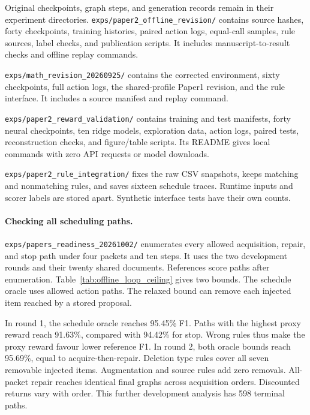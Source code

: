 \label{app:artifact_index}

Original checkpoints, graph steps, and generation records remain in
their experiment directories.
\texttt{exps/paper2\_offline\_revision/} contains source hashes, forty
checkpoints, training histories, paired action logs, equal-call samples,
rule sources, label checks, and publication scripts. It includes
manuscript-to-result checks and offline replay commands.

\texttt{exps/math\_revision\_20260925/} contains the corrected environment,
sixty checkpoints, full action logs, the shared-profile Paper1 revision,
and the rule interface. It includes a source manifest and replay command.

\texttt{exps/paper2\_reward\_validation/} contains training and test
manifests, forty neural checkpoints, ten ridge models, exploration data,
action logs, paired tests, reconstruction checks, and figure/table scripts.
Its README gives local commands with zero API requests or model downloads.

\texttt{exps/paper2\_rule\_integration/} fixes the raw CSV snapshots,
keeps matching and nonmatching rules, and saves sixteen schedule traces.
Runtime inputs and scorer labels are stored apart. Synthetic interface
tests have their own counts.

\paragraph{Checking all scheduling paths.}

\texttt{exps/papers\_readiness\_20261002/} enumerates every allowed
acquisition, repair, and stop path under four packets and ten steps.
It uses the two development rounds and their twenty shared documents.
References score paths after enumeration.
Table~\ref{tab:offline_loop_ceiling} gives two bounds. The schedule oracle
uses allowed action paths. The relaxed bound can remove each injected
item reached by a stored proposal.



In round 1, the schedule oracle reaches 95.45\% F1. Paths with the
highest proxy reward reach 91.63\%, compared with 94.42\% for stop.
Wrong rules thus make the proxy reward favour lower reference F1.
In round 2, both oracle bounds reach 95.69\%, equal to
acquire-then-repair. Deletion type rules cover all seven removable
injected items. Augmentation and source rules add zero removals.
All-packet repair reaches identical final graphs across acquisition
orders. Discounted returns vary with order. This further development
analysis has 598 terminal paths.

